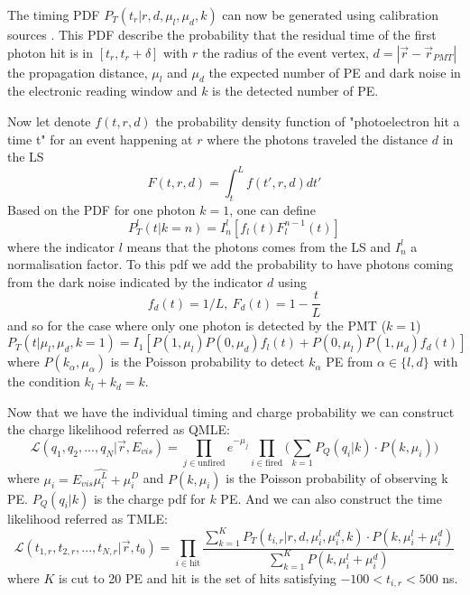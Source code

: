 \documentclass[../main.tex]{subfiles}
\begin{document}
The timing PDF $P_T(t_r | r,d,\mu_l,\mu_d,k)$ can now be generated using calibration sources \cite{huang_data-driven_2023}. This PDF describe the probability that the residual time of the first photon hit is in $[t_r, t_r + \delta]$ with $r$ the radius of the event vertex, $d = |\vec{r} - \vec{r}_{PMT}|$ the propagation distance, $\mu_l$ and $\mu_d$ the expected number of PE and dark noise in the electronic reading window and $k$ is the detected number of PE.

Now let denote $f(t, r, d)$ the probability density function of "photoelectron hit a time t" for an event happening at $r$ where the photons traveled the distance $d$ in the LS
\begin{equation}
  F(t, r, d) = \int_t^L f(t', r, d)dt'
\end{equation}
Based on the PDF for one photon $k=1$, one can define
\begin{equation}
  P^l_T(t|k=n) = I^l_n [f_l(t)F^{n-1}_l(t)]
\end{equation}
where the indicator $l$ means that the photons comes from the LS and $I^l_n$ a normalisation factor. To this pdf we add the probability to have photons coming from the dark noise indicated by the indicator $d$ using
\begin{equation}
  f_d(t) = 1 / L, ~ F_d(t) = 1 - \frac{t}{L}
\end{equation}
and so for the case where only one photon is detected by the PMT ($k=1$)
\begin{equation}
  P_T(t|\mu_l, \mu_d, k = 1) = I_1 [ P(1, \mu_l) P(0, \mu_d) f_l(t) + P(0, \mu_l) P(1, \mu_d) f_d(t) ]
\end{equation}
where $P(k_\alpha, \mu_\alpha)$ is the Poisson probability to detect $k_\alpha$ PE from $\alpha \in \{l, d\}$ with the condition $k_l + k_d = k$.

Now that we have the individual timing and charge probability we can construct the charge likelihood referred as QMLE:
\begin{equation}
  \mathcal{L}(q_1, q_2, ..., q_N | \vec{r}, E_{vis}) = \prod_{j \in \mathrm{unfired}} e^{-\mu_j} \prod_{i \in \mathrm{fired}} \bigg(\sum_{k=1} P_Q(q_i|k) \cdot P(k, \mu_i) \bigg)
\end{equation}
where $\mu_i = E_{vis} \hat{\mu_i^L} + \mu_i^D$ and $P(k, \mu_i)$ is the Poisson probability of observing k PE. $P_Q(q_i|k)$ is the charge pdf for $k$ PE. And we can also construct the time likelihood referred as TMLE:
\begin{equation}
  \mathcal{L}(t_{1,r}, t_{2,r}, ..., t_{N,r} | \vec{r}, t_0) = \prod_{i \in \mathrm{hit}} \frac{\sum_{k=1}^K P_T(t_{i,r} | r, d, \mu_i^l, \mu_i^d, k) \cdot P(k, \mu^l_i + \mu^d_i)}{\sum_{k=1}^K P(k, \mu^l_i + \mu^d_i)}
\end{equation}
where $K$ is cut to 20 PE and hit is the set of hits satisfying $-100 < t_{i,r} < 500$ ns.
\end{document}
